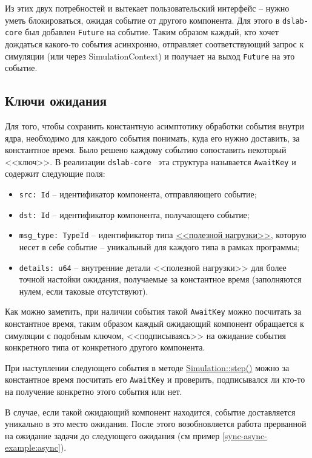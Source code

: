Из этих двух потребностей и вытекает пользовательский интерфейс -- нужно уметь блокироваться, ожидая событие от другого компонента. Для этого в \texttt{dslab-core} был добавлен \texttt{Future} на событие. Таким образом каждый, кто хочет дождаться какого-то события асинхронно, отправляет соответствующий запрос к симуляции (или через SimulationContext) и получает на выход \texttt{Future} на это событие. 

\subsection{Ключи ожидания} \label{awaitkey}

Для того, чтобы сохранить константную асимптотику обработки события внутри ядра, необходимо для каждого события понимать, куда его нужно доставить, за константное время. Было решено каждому событию сопоставить некоторый <<ключ>>. В реализации \texttt{dslab-core}~\cite{async-dslab-core} эта структура называется \texttt{AwaitKey} и содержит следующие поля: 
\begin{itemize}
    \item \texttt{src: Id} -- идентификатор компонента, отправляющего событие;
    \item \texttt{dst: Id} -- идентификатор компонента, получающего событие;
    \item \texttt{msg\_type: TypeId} -- идентификатор типа \hyperref[Event:payload]{<<полезной нагрузки>>}, которую несет в себе событие -- уникальный для каждого типа в рамках программы;
    \item \texttt{details: u64} -- внутренние детали <<полезной нагрузки>> для более точной настойки ожидания, получаемые за константное время (заполняются нулем, если таковые отсутствуют).
\end{itemize}  

Как можно заметить, при наличии события такой \texttt{AwaitKey} можно посчитать за константное время, таким образом каждый ожидающий компонент обращается к симуляции с подобным ключом, <<подписываясь>> на ожидание события конкретного типа от конкретного другого компонента.

При наступлении следующего события в методе \hyperref[Simulation::step]{Simulation::step()} можно за константное время посчитать его \texttt{AwaitKey} и проверить, подписывался ли кто-то на получение конкретно этого события или нет. 

В случае, если такой ожидающий компонент находится, событие доставляется уникально в это место ожидания. После этого возобновляется работа прерванной на ожидание задачи до следующего ожидания (см пример \ref{sync-async-example:async}).

